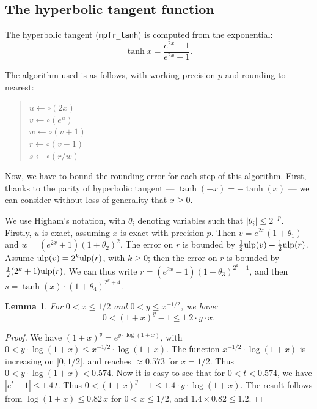 \documentclass[12pt]{amsart}
\def\ulp{{\rm ulp}}
\newtheorem{lemma}{Lemma}
\begin{document}
\subsection{The hyperbolic tangent function}

The hyperbolic tangent (\texttt{mpfr\_tanh}) is computed from the exponential:
\[ \tanh x = \frac{ e^{2 x} -1 }{ e^{2 x} +1}. \]

The algorithm used is as follows, with working
precision $p$ and rounding to nearest:
\begin{quote}
$u \leftarrow \circ(2 x)$ \\
$v \leftarrow \circ(e^u)$ \\
$w \leftarrow \circ(v+1)$ \\
$r \leftarrow \circ(v-1)$ \\
$s \leftarrow \circ(r/w)$
\end{quote}
Now, we have to bound the rounding error for each step of this
algorithm.  First, thanks to the parity of hyperbolic tangent
--- $\tanh(-x)=-\tanh(x)$ --- we can consider without loss of generality
that $x \geq 0$.

We use Higham's notation, with $\theta_i$ denoting variables such that
$|\theta_i| \leq 2^{-p}$.
Firstly, $u$ is exact, assuming $x$ is exact with precision $p$.
Then $v = e^{2x} (1+\theta_1)$ and
$w = (e^{2x}+1) (1+\theta_2)^2$.
The error on $r$ is bounded by $\frac{1}{2} \ulp(v) + \frac{1}{2} \ulp(r)$.
Assume $\ulp(v) = 2^k \ulp(r)$, with $k \geq 0$;
then the error on $r$ is bounded by $\frac{1}{2} (2^k+1) \ulp(r)$.
We can thus write $r = (e^{2x}-1) (1+\theta_3)^{2^k+1}$,
and then $s = \tanh(x) \cdot (1+\theta_4)^{2^k+4}$.

\begin{lemma}
For $0 < x \leq 1/2$ and $0 < y \leq x^{-1/2}$, we have:
\[ 0 < (1+x)^y - 1 \leq 1.2 \cdot y \cdot x. \]
\end{lemma}
\begin{proof}
We have $(1+x)^y = e^{y \cdot \log(1+x)}$, with
$0 < y \cdot \log(1+x) \leq x^{-1/2} \cdot \log(1+x)$.
The function $x^{-1/2} \cdot \log(1+x)$ is increasing on $]0,1/2]$,
and reaches $\approx 0.573$ for $x = 1/2$.
Thus $0 < y \cdot \log(1+x) < 0.574$.
Now it is easy to see that for $0 < t < 0.574$, we have
$|e^t-1| \leq 1.4\,t$.
Thus $0 < (1+x)^y - 1 \leq 1.4 \cdot y \cdot \log(1+x)$.
The result follows from $\log(1+x) \leq 0.82\,x$ for
$0 < x \leq 1/2$, and $1.4 \times 0.82 \leq 1.2$.
\end{proof}

\end{document}
